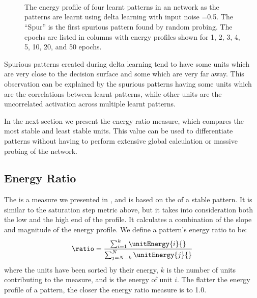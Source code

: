 \begin{figure}[p]
	\center
	\small
	\scalebox{0.54}{}
	\scalebox{0.54}{}
	\\
	\scalebox{0.54}{}
	\scalebox{0.54}{}
	\\
	\scalebox{0.54}{}
	\scalebox{0.54}{}
	\\
	\scalebox{0.54}{}
	\scalebox{0.54}{}
	\caption{The energy profile of four learnt patterns in an  network as the patterns are learnt using delta learning  with input noise =0.5. The ``Spur'' is the first spurious pattern found by random probing.  The epochs are listed in columns with energy profiles shown for 1, 2, 3, 4, 5, 10, 20, and 50 epochs.}
	\label{fig:DeltaEnergyLearning}
\end{figure}


Spurious patterns created during delta learning tend to have some units which are very close to the decision surface and some which are very far away.  This observation can be explained by the spurious patterns having some units which are the correlations between learnt patterns,  while other units are the uncorrelated activation across multiple learnt patterns.  

In the next section we present the energy ratio measure, which compares the most stable and least stable units.  This value can be used to differentiate patterns without having to perform extensive global calculation or massive probing of the network.  

\subsection{Energy Ratio}

The  is a measure we presented in \citet{Robins2004}, and is based on the  of a stable pattern.  It is similar to the saturation step metric above, but it takes into consideration both the low and the high end of the profile. It calculates a combination of the slope and magnitude of the energy profile.  We define a pattern's energy ratio to be:
\begin{equation}
\ratio = \frac{\sum_{i=1}^{k}{\unitEnergy{i}{}}}{\sum_{j=N-k}^{N}{\unitEnergy{j}{}}}
\end{equation}
where the units have been sorted by their energy, $k$ is the number of units contributing to the measure, and  is the energy of unit $i$. The flatter the energy profile of a pattern, the closer the energy ratio measure is to 1.0.
 
